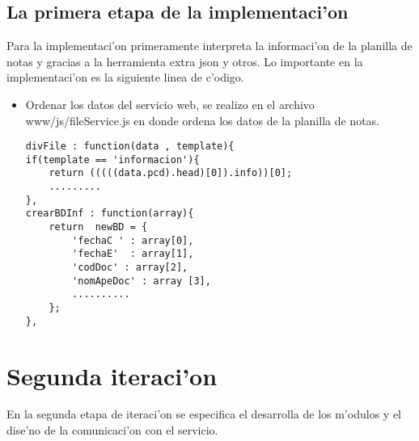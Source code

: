 \subsection{La primera etapa de la implementaci'on}
Para la implementaci'on primeramente interpreta la informaci'on de la planilla de notas y gracias a la herramienta extra json y otros. Lo importante en la implementaci'on es la siguiente linea de c'odigo.
\begin{itemize}
\item Ordenar los datos del servicio web, se realizo en el archivo www/js/fileService.js en donde ordena los datos de la planilla de notas.

\begin{verbatim}
divFile : function(data , template){
if(template == 'informacion'){
   	return (((((data.pcd).head)[0]).info))[0];
	.........
},
crearBDInf : function(array){
	return  newBD = {
    	'fechaC ' : array[0],
        'fechaE'  : array[1],
        'codDoc' : array[2],
        'nomApeDoc' : array [3],
        ..........
    };
},
\end{verbatim}
\end{itemize}
  
\section{Segunda iteraci'on}
En la segunda etapa de iteraci'on se especifica el desarrolla de los m'odulos y el dise'no de la comunicaci'on con el servicio.




